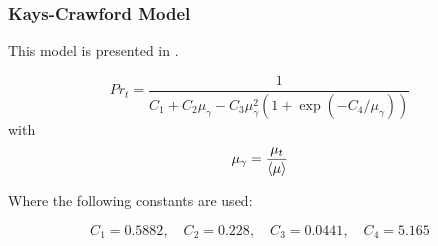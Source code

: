 
\subsubsection{Kays-Crawford Model}
This model is presented in \cite{kays2012convective}.

\begin{equation}
Pr_{t} = \frac{1}{C_1+C_2\mu_\gamma-C_3\mu_\gamma^2(1+\exp(-C_4/\mu_\gamma))}
\end{equation}
with 
\begin{equation}
\mu_\gamma = \frac{\mu_t}{\left<{\mu}\right>}
\end{equation}


Where the following constants are used:

\begin{equation}
C_1=0.5882, \quad C_2=0.228, \quad C_3=0.0441, \quad C_4=5.165
\end{equation}

